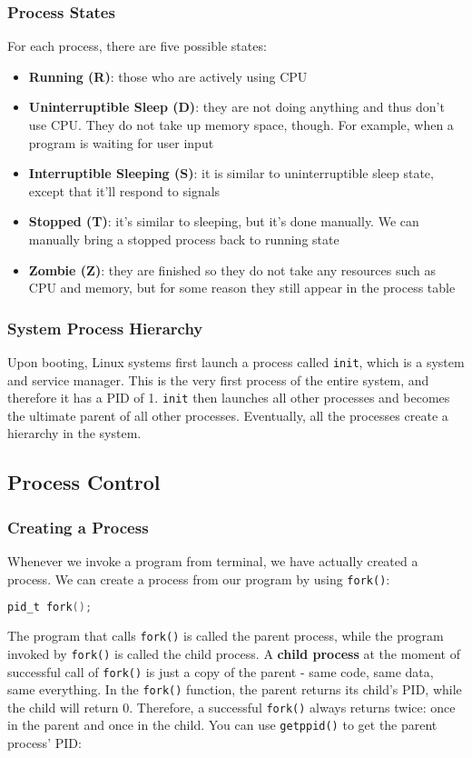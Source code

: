 \documentclass{article}
\newcommand{\bold}[1]{\textbf{#1}}
\renewcommand{\b}{\item[$\circ$]}
\newcommand{\newlist}{\begin{itemize}}
\renewcommand{\endlist}{\end{itemize}}
\newcommand{\code}[1]{\texttt{#1}}
\begin{document}
\subsubsection{Process States}

For each process, there are five possible states:

\newlist
\b \bold{Running (R)}: those who are actively using CPU
\b \bold{Uninterruptible Sleep (D)}: they are not doing anything and thus don't use CPU. They do not take up memory space, though. For example, when a program is waiting for user input
\b \bold{Interruptible Sleeping (S)}: it is similar to uninterruptible sleep state, except that it'll respond to signals
\b \bold{Stopped (T)}: it's similar to sleeping, but it's done manually. We can manually bring a stopped process back to running state
\b \bold{Zombie (Z)}: they are finished so they do not take any resources such as CPU and memory, but for some reason they still appear in the process table
\endlist

\subsubsection{System Process Hierarchy}

Upon booting, Linux systems first launch a process called \code{init}, which is a system and service manager. This is the very first process of the entire system, and therefore it has a PID of 1. \code{init} then launches all other processes and becomes the ultimate parent of all other processes. Eventually, all the processes create a hierarchy in the system. 

\subsection{Process Control}

\subsubsection{Creating a Process}

Whenever we invoke a program from terminal, we have actually created a process. We can create a process from our program by using \code{fork()}: 

\begin{lstlisting}[language=c]
pid_t fork();
\end{lstlisting}

The program that calls \code{fork()} is called the parent process, while the program invoked by \code{fork()} is called the child process. A \bold{child process} at the moment of successful call of \code{fork()} is just a copy of the parent - same code, same data, same everything. In the \code{fork()} function, the parent returns its child's PID, while the child will return 0. Therefore, a successful \code{fork()} always returns twice: once in the parent and once in the child. You can use \code{getppid()} to get the parent process' PID: 
\end{document}
